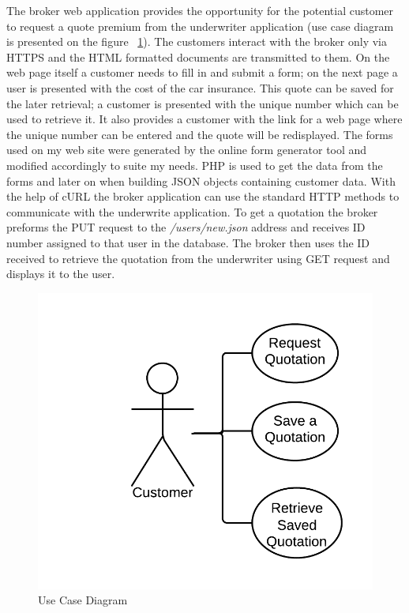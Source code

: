 \documentclass[10pt,a4paper,headinclude=true,twoside]{report}
\begin{document}
The broker web application provides the opportunity for the potential customer to request a quote premium from the underwriter application (use case diagram is presented on the figure ~\ref{fig:usecase}). The customers interact with the broker only via HTTPS and the HTML formatted documents are transmitted to them. On the web page itself a customer needs to fill in and submit a form; on the next page a user is presented with the cost of the car insurance. This quote can be saved for the later retrieval; a customer is presented with the unique number which can be used to retrieve it. It also provides a customer with the link for a web page where the unique number can be entered and the quote will be redisplayed. The forms used on my web site were generated by the online form generator tool and modified accordingly to suite my needs. PHP is used to get the data from the forms and later on when building JSON objects containing customer data. With the help of cURL the broker application can use the standard HTTP methods to communicate with the underwrite application. To get a quotation the broker preforms the PUT request to the \textit{/users/new.json} address and receives ID number assigned to that user in the database. The broker then uses the ID received to retrieve the quotation from the underwriter using GET request and displays it to the user.


\begin{figure}[H]
\centering
\centerline{\includegraphics[scale=0.25]{./usecase}}
\caption{Use Case Diagram}
\label{fig:usecase}
\end{figure} 
\end{document}
